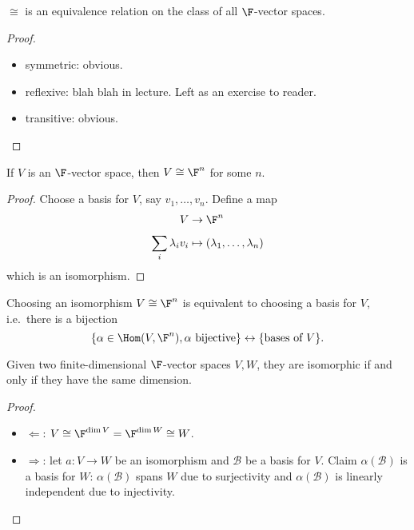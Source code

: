 \documentclass[a4paper]{article}
\newcommand*{\basis}{\mathcal}
\theoremstyle{definition}
\begin{document}
\begin{lemma}
  \(\cong\) is an equivalence relation on the class of all \(\F\)-vector spaces.
\end{lemma}

\begin{proof}\leavevmode
  \begin{itemize}
  \item symmetric: obvious.
  \item reflexive: blah blah in lecture. Left as an exercise to reader.
  \item transitive: obvious.
  \end{itemize}
\end{proof}

\begin{theorem}
  If \(V\) is an \(\F\)-vector space, then \(V \cong \F^n\) for some \(n\).
\end{theorem}

\begin{proof}
  Choose a basis for \(V\), say \(v_1,\ldots, v_n\). Define a map
  \begin{align*}
    V &\to \F^n \\
    \sum_{i}^{ }\lambda_iv_i &\mapsto (\lambda_1,\ldots,\lambda_n)
  \end{align*}
which is an isomorphism.
\end{proof}

\begin{remark}
  Choosing an isomorphism \(V \cong \F^n\) is equivalent to choosing a basis for \(V\), i.e.\ there is a bijection
  \[
    \{\alpha\in\Hom(V,\F^n), \alpha\text{ bijective}\} \leftrightarrow \{\text{bases of } V\}.
  \]
\end{remark}

\begin{theorem}
  Given two finite-dimensional \(\F\)-vector spaces \(V, W\), they are isomorphic if and only if they have the same dimension.
\end{theorem}

\begin{proof}\leavevmode
  \begin{itemize}
  \item \(\Leftarrow\): \(V \cong \F^{\dim V} = \F^{\dim W} \cong W\).
  \item \(\Rightarrow\): let \(a:V\to W\) be an isomorphism and \(\basis B\) be a basis for \(V\). Claim \(\alpha(\basis B)\) is a basis for \(W\): \(\alpha(\basis B)\) spans \(W\) due to surjectivity and \(\alpha(\basis B)\) is linearly independent due to injectivity.
  \end{itemize}
\end{proof}
\end{document}
